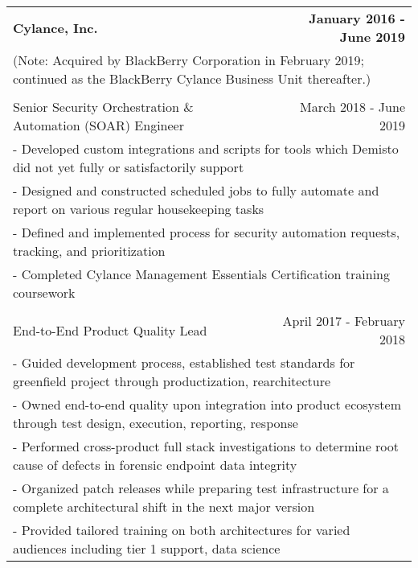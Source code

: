 \documentclass[letterpaper]{article}
\begin{document}
\begin{center}
\begin{tabular}{p{}p{}r}
			\\
				\textbf{Cylance, Inc.} & &
				\textbf{January 2016 - June 2019\quad}
			\\		%
				\multicolumn{3}{p{\textwidth}}{(Note: Acquired by BlackBerry Corporation in February 2019; continued as the BlackBerry Cylance Business Unit thereafter.)}
			\\
			\\
				\multicolumn{2}{p{0.5\textwidth}}{\quad Senior Security Orchestration \& Automation (SOAR) Engineer}
				&
				{March 2018 - June 2019 \quad\quad\quad\quad}
			\\
				\multicolumn{3}{p{\textwidth}}{\quad\quad - Developed custom integrations and scripts for tools which Demisto did not yet fully or satisfactorily support}
			\\
				\multicolumn{3}{p{\textwidth}}{\quad\quad - Designed and constructed scheduled jobs to fully automate and report on various regular housekeeping tasks}
			\\
				\multicolumn{3}{p{\textwidth}}{\quad\quad - Defined and implemented process for security automation requests, tracking, and prioritization}
			\\
				\multicolumn{3}{p{\textwidth}}{\quad\quad - Completed Cylance Management Essentials Certification training coursework}
			\\
		  \\		%
			  \multicolumn{2}{p{0.5\textwidth}}{\quad End-to-End Product Quality Lead}
			  &
			  {April 2017 - February 2018 \quad\quad\quad\quad}
		  \\
			  \multicolumn{3}{p{\textwidth}}{\quad\quad - Guided development process, established test standards for greenfield project through productization, rearchitecture} 
		  \\
			  \multicolumn{3}{p{\textwidth}}{\quad\quad - Owned end-to-end quality upon integration into product ecosystem through test design, execution, reporting, response} 
		  \\
			  \multicolumn{3}{p{\textwidth}}{\quad\quad - Performed cross-product full stack investigations to determine root cause of defects in forensic endpoint data integrity} 
		  \\
			  \multicolumn{3}{p{\textwidth}}{\quad\quad - Organized patch releases while preparing test infrastructure for a complete architectural shift in the next major version} 
		  \\
			  \multicolumn{3}{p{\textwidth}}{\quad\quad - Provided tailored training on both architectures for varied audiences including tier 1 support, data science}

\end{tabular}
\end{center}
\end{document}
